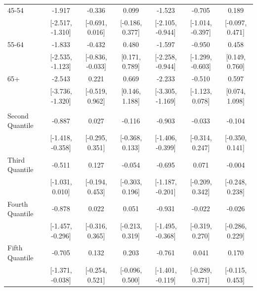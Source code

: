 \documentclass[
  10,
  letterpaper,
  DIV=11,
  numbers=noendperiod]{scrartcl}
\begin{document}
\begin{table}
\begin{tabular}[t]{lcccccc}
\hspace{1em}45-54 & -1.917 & -0.336 & 0.099 & -1.523 & -0.705 & 0.189\\
\hspace{1em} & {}[-2.517, -1.310] & {}[-0.691, 0.016] & {}[-0.186, 0.377] & {}[-2.105, -0.944] & {}[-1.014, -0.397] & {}[-0.097, 0.471]\\
\hspace{1em}55-64 & -1.833 & -0.432 & 0.480 & -1.597 & -0.950 & 0.458\\
\hspace{1em} & {}[-2.535, -1.123] & {}[-0.836, -0.033] & {}[0.171, 0.789] & {}[-2.258, -0.944] & {}[-1.299, -0.603] & {}[0.149, 0.760]\\
\hspace{1em}65+ & -2.543 & 0.221 & 0.669 & -2.233 & -0.510 & 0.597\\
\hspace{1em} & {}[-3.736, -1.320] & {}[-0.519, 0.962] & {}[0.146, 1.188] & {}[-3.305, -1.169] & {}[-1.123, 0.078] & {}[0.074, 1.098]\\
\addlinespace[0.3em]
\multicolumn{7}{l}{\cellcolor[HTML]{3498DB}{\textbf{Income}}}\\
\hspace{1em}Second Quantile & -0.887 & 0.027 & -0.116 & -0.903 & -0.033 & -0.104\\
\hspace{1em} & {}[-1.418, -0.358] & {}[-0.295, 0.351] & {}[-0.368, 0.133] & {}[-1.406, -0.399] & {}[-0.314, 0.247] & {}[-0.350, 0.141]\\
\hspace{1em}Third Quantile & -0.511 & 0.127 & -0.054 & -0.695 & 0.071 & -0.004\\
\hspace{1em} & {}[-1.031, 0.010] & {}[-0.194, 0.453] & {}[-0.303, 0.196] & {}[-1.187, -0.201] & {}[-0.209, 0.342] & {}[-0.248, 0.238]\\
\hspace{1em}Fourth Quantile & -0.878 & 0.022 & 0.051 & -0.931 & -0.022 & -0.026\\
\hspace{1em} & {}[-1.457, -0.296] & {}[-0.316, 0.365] & {}[-0.213, 0.319] & {}[-1.495, -0.368] & {}[-0.319, 0.270] & {}[-0.286, 0.229]\\
\hspace{1em}Fifth Quantile & -0.705 & 0.132 & 0.203 & -0.761 & 0.041 & 0.170\\
\hspace{1em} & {}[-1.371, -0.038] & {}[-0.254, 0.521] & {}[-0.096, 0.500] & {}[-1.401, -0.119] & {}[-0.289, 0.371] & {}[-0.115, 0.453]\\

\end{tabular}
\end{table}
\end{document}

